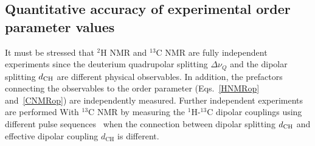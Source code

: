 \documentclass[aps,prl,superscriptaddress,twocolumn]{revtex4}
\begin{document}
\subsection{Quantitative accuracy of experimental order parameter values}

It must be stressed that $^2$H NMR and $^{13}$C NMR are fully independent experiments since the deuterium quadrupolar splitting $\Delta \nu_Q$
and the dipolar splitting $d_{{\rm CH}}$ are different physical observables. In addition, the prefactors connecting the observables to the order 
parameter (Eqs.~\ref{HNMRop} and~\ref{CNMRop}) are independently measured. Further independent experiments are performed With $^{13}$C NMR 
by measuring the $^1$H-$^{13}$C dipolar couplings using different pulse sequences~\cite{hong95a,gross97,dvinskikh05a,ferreira13} when the connection
between dipolar splitting $d_{{\rm CH}}$ and effective dipolar coupling $d_\mathrm{CH}$ is different.
\end{document}

